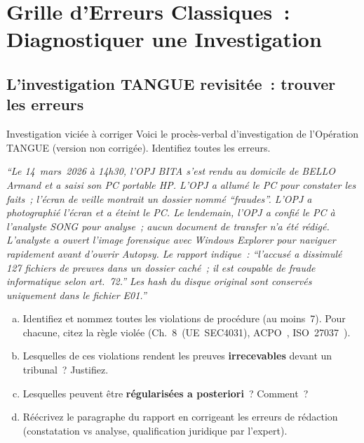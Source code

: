 \section{Grille d'Erreurs Classiques~: Diagnostiquer une Investigation}
\label{sec:erreurs-classiques}

\subsection{L'investigation TANGUE revisitée~: trouver les erreurs}

\begin{boxscenario}{Investigation viciée à corriger}
Voici le procès-verbal d'investigation de l'Opération TANGUE
(version non corrigée). Identifiez toutes les erreurs.

\textit{``Le 14~mars~2026 à 14h30, l'OPJ BITA s'est rendu au
domicile de BELLO Armand et a saisi son PC portable HP. L'OPJ
a allumé le PC pour constater les faits~; l'écran de veille
montrait un dossier nommé ``fraudes''. L'OPJ a photographié
l'écran et a éteint le PC. Le lendemain, l'OPJ a confié le PC
à l'analyste SONG pour analyse~; aucun document de transfer
n'a été rédigé. L'analyste a ouvert l'image forensique avec
Windows Explorer pour naviguer rapidement avant d'ouvrir Autopsy.
Le rapport indique~: ``l'accusé a dissimulé 127 fichiers de
preuves dans un dossier caché~; il est coupable de fraude
informatique selon art.~72.'' Les hash du disque original
sont conservés uniquement dans le fichier E01.''}
\end{boxscenario}

\begin{boxexo}[title={\ding{45}\quad Diagnostic d'investigation viciée}]
\begin{enumerate}[(a)]
    \item Identifiez et nommez toutes les violations de procédure
          (au moins~7). Pour chacune, citez la règle violée
          (Ch.~8~(UE~SEC4031), ACPO~\cite{acpo2012}, ISO~27037~\cite{iso27037}).
    \item Lesquelles de ces violations rendent les preuves
          \textbf{irrecevables} devant un tribunal~? Justifiez.
    \item Lesquelles peuvent être \textbf{régularisées a posteriori}~?
          Comment~?
    \item Réécrivez le paragraphe du rapport en corrigeant les
          erreurs de rédaction (constatation vs analyse,
          qualification juridique par l'expert).
\end{enumerate}
\end{boxexo}

